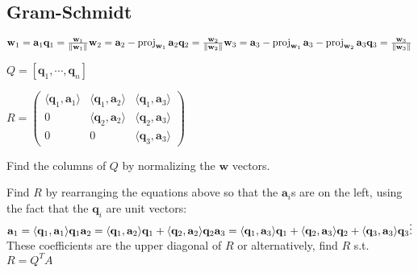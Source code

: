 \documentclass[10pt,letterpaper]{article}
\newenvironment{tight_enum}
{\begin{enumerate}
\setlength{\parskip}{0pt}
\setlength{\parsep}{0pt}
\setlength{\itemsep}{0pt}
\setlength{\parsep}{0pt}
\setlength{\topsep}{0pt}
\setlength{\partopsep}{0pt}
\setlength{\leftmargin}{0em}
\setlength{\labelwidth}{0em}
\setlength{\labelsep}{0em} }
{\end{enumerate}}
\begin{document}
{\begin{multicols*}{5}
\subsection{Gram-Schmidt}
$ \mathbf{w}_1 = \mathbf{a}_1 \\ 
   \mathbf{q}_1 = {\mathbf{w}_1 \over \|\mathbf{w}_1\|} \\
 \mathbf{w}_2 = \mathbf{a}_2-\mathrm{proj}_{\mathbf{w}_1}\,\mathbf{a}_2 \\
   \mathbf{q}_2 = {\mathbf{w}_2 \over \|\mathbf{w}_2\|} \\
 \mathbf{w}_3 = \mathbf{a}_3-\mathrm{proj}_{\mathbf{w}_1}\,\mathbf{a}_3-\mathrm{proj}_{\mathbf{w}_2}\,\mathbf{a}_3 \\
   \mathbf{q}_3 = {\mathbf{w}_3 \over \|\mathbf{w}_3\|} \\
$
\begin{center}
$Q = \left[ \mathbf{q}_1, \cdots, \mathbf{q}_n\right] \qquad$
\end{center}
$R = \begin{pmatrix} 
\langle\mathbf{q}_1,\mathbf{a}_1\rangle & \langle\mathbf{q}_1,\mathbf{a}_2\rangle &  \langle\mathbf{q}_1,\mathbf{a}_3\rangle\\
0                & \langle\mathbf{q}_2,\mathbf{a}_2\rangle                        &  \langle\mathbf{q}_2,\mathbf{a}_3\rangle\\
0                & 0                                       & \langle\mathbf{q}_3,\mathbf{a}_3\rangle                        \end{pmatrix}$
\begin{tight_enum}
\item Find the columns of $Q$ by normalizing the $\textbf{w}$ vectors.
\item Find $R$ by rearranging the equations above so that the $\mathbf{a}_i$s are on the left, using the fact that the $\mathbf{q}_i$ are unit vectors:\\
$
 \mathbf{a}_1 = \langle\mathbf{q}_1,\mathbf{a}_1 \rangle \mathbf{q}_1  \\
 \mathbf{a}_2 = \langle\mathbf{q}_1,\mathbf{a}_2 \rangle \mathbf{q}_1 
  + \langle\mathbf{q}_2,\mathbf{a}_2 \rangle \mathbf{q}_2 \\
 \mathbf{a}_3 = \langle\mathbf{q}_1,\mathbf{a}_3 \rangle \mathbf{q}_1 
  + \langle\mathbf{q}_2,\mathbf{a}_3 \rangle \mathbf{q}_2 
  + \langle\mathbf{q}_3,\mathbf{a}_3 \rangle \mathbf{q}_3 \\
 \vdots $ \\
These coefficients are the upper diagonal of $R$ or alternatively, find $R$ s.t. $R =Q^{T}A$
\end{tight_enum}

\end{multicols*}}
\end{document}

